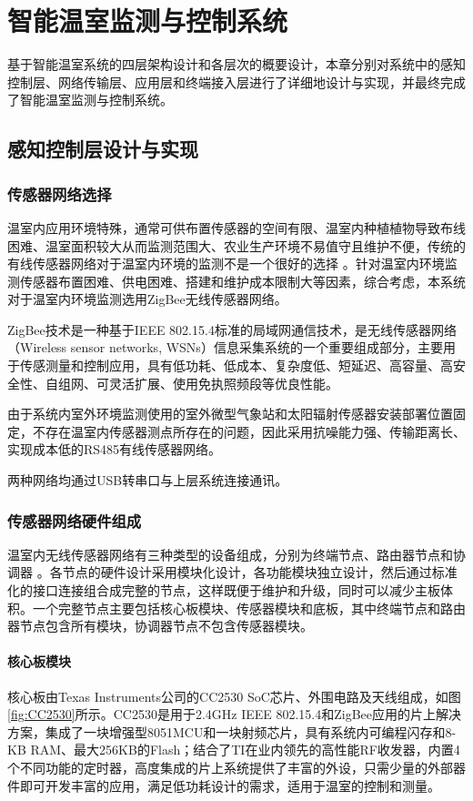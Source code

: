 

\chapter{智能温室监测与控制系统}
\label{chapter:IntelligentGreenhouseSystem}
基于智能温室系统的四层架构设计和各层次的概要设计，本章分别对系统中的感知控制层、网络传输层、应用层和终端接入层进行了详细地设计与实现，并最终完成了智能温室监测与控制系统。

\section{感知控制层设计与实现}
	\subsection{传感器网络选择}
温室内应用环境特殊，通常可供布置传感器的空间有限、温室内种植植物导致布线困难、温室面积较大从而监测范围大、农业生产环境不易值守且维护不便，传统的有线传感器网络对于温室内环境的监测不是一个很好的选择\supercite{YangFan2008} 。针对温室内环境监测传感器布置困难、供电困难、搭建和维护成本限制大等因素，综合考虑，本系统对于温室内环境监测选用ZigBee无线传感器网络。

ZigBee技术是一种基于IEEE 802.15.4标准的局域网通信技术，是无线传感器网络（Wireless sensor networks, WSNs）信息采集系统的一个重要组成部分，主要用于传感测量和控制应用，具有低功耗、低成本、复杂度低、短延迟、高容量、高安全性、自组网、可灵活扩展、使用免执照频段等优良性能。

由于系统内室外环境监测使用的室外微型气象站和太阳辐射传感器安装部署位置固定，不存在温室内传感器测点所存在的问题，因此采用抗噪能力强、传输距离长、实现成本低的RS485有线传感器网络。

两种网络均通过USB转串口与上层系统连接通讯。
	\subsection{传感器网络硬件组成}
	温室内无线传感器网络有三种类型的设备组成，分别为终端节点、路由器节点和协调器\supercite{ZhouJianmin2011} 。各节点的硬件设计采用模块化设计，各功能模块独立设计，然后通过标准化的接口连接组合成完整的节点，这样既便于维护和升级，同时可以减少主板体积。一个完整节点主要包括核心板模块、传感器模块和底板，其中终端节点和路由器节点包含所有模块，协调器节点不包含传感器模块。
		\subsubsection{核心板模块}
		核心板由Texas Instruments公司的CC2530 SoC芯片、外围电路及天线组成，如图\ref{fig:CC2530}所示。CC2530是用于2.4GHz IEEE 802.15.4和ZigBee应用的片上解决方案，集成了一块增强型8051MCU和一块射频芯片，具有系统内可编程闪存和8-KB RAM、最大256KB的Flash；结合了TI在业内领先的高性能RF收发器，内置4个不同功能的定时器，高度集成的片上系统提供了丰富的外设，只需少量的外部器件即可开发丰富的应用，满足低功耗设计的需求，适用于温室的控制和测量。
		

